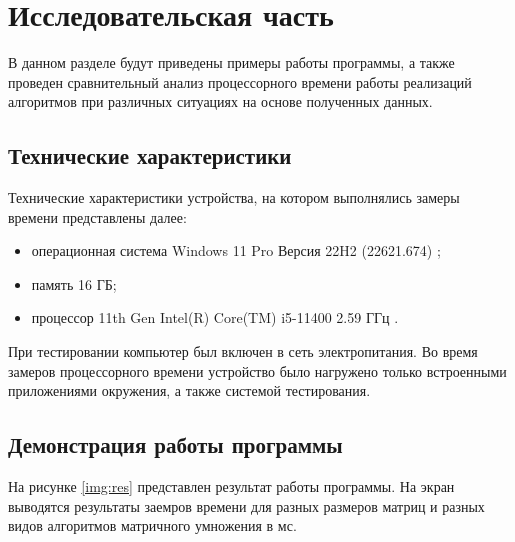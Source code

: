 \chapter{Исследовательская часть}

В данном разделе будут приведены примеры работы программы, а также проведен сравнительный анализ процессорного времени работы реализаций алгоритмов при различных ситуациях на основе полученных данных.

\section{Технические характеристики}

Технические характеристики устройства, на котором выполнялись замеры времени представлены далее:

\begin{itemize}
	\item операционная система Windows 11 Pro Версия 22H2 (22621.674) \cite{wind};
	\item память 16 ГБ;
	\item процессор 11th Gen Intel(R) Core(TM) i5-11400 2.59 ГГц \cite{proc}.
\end{itemize}

При тестировании компьютер был включен в сеть электропитания. Во время замеров процессорного времени устройство было нагружено только встроенными приложениями окружения, а также системой тестирования.

\section{Демонстрация работы программы}

На рисунке \ref{img:res} представлен результат работы программы. На экран выводятся результаты заемров времени для разных размеров матриц и разных видов алгоритмов матричного умножения в мс.
\newpage
%
\begin{center}
	\label{img:res}
\end{center}

